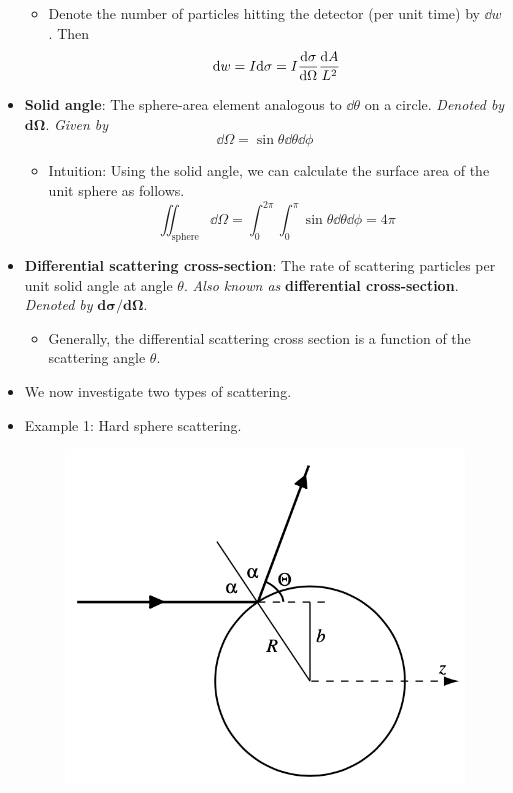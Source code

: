\documentclass[../notes.tex]{subfiles}
\begin{document}
\begin{itemize}
\begin{itemize}
\begin{itemize}
        \end{itemize}
        \item Denote the number of particles hitting the detector (per unit time) by $\dd{w}$. Then
        \begin{equation*}
            \dd{w} = I\dd\sigma = I\dv{\sigma}{\Omega}\frac{\dd{A}}{L^2}
        \end{equation*}
    \end{itemize}
    \item \textbf{Solid angle}: The sphere-area element analogous to $\dd{\theta}$ on a circle. \emph{Denoted by} $\bm{\textbf{d}\Omega}$. \emph{Given by}
    \begin{equation*}
        \dd{\Omega} = \sin\theta\dd{\theta}\dd{\phi}
    \end{equation*}
    \begin{itemize}
        \item Intuition: Using the solid angle, we can calculate the surface area of the unit sphere as follows.
        \begin{equation*}
            \iint_\text{sphere}\dd{\Omega} = \int_0^{2\pi}\int_0^\pi\sin\theta\dd{\theta}\dd{\phi} = 4\pi
        \end{equation*}
    \end{itemize}
    \item \textbf{Differential scattering cross-section}: The rate of scattering particles per unit solid angle at angle $\theta$. \emph{Also known as} \textbf{differential cross-section}. \emph{Denoted by} $\bm{\textbf{d}\sigma/\textbf{d}\Omega}$.
    \begin{itemize}
        \item Generally, the differential scattering cross section is a function of the scattering angle $\theta$.
    \end{itemize}
    \item We now investigate two types of scattering.
    \item Example 1: Hard sphere scattering.
    \begin{figure}[h!]
        \centering
        \includegraphics[width=0.35\linewidth]{../ExtFiles/scatteringHS.png}

\end{figure}
\end{itemize}
\end{document}
